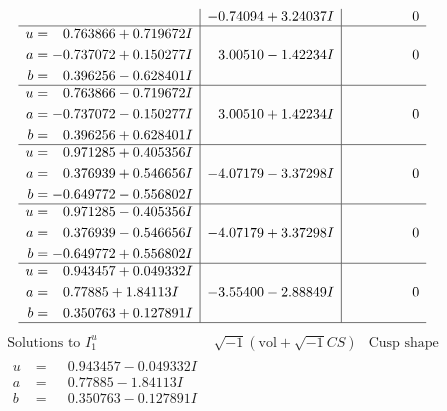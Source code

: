 \documentclass[1p]{elsarticle_modified}
\theoremstyle{definition}
\newcommand{\I}{\sqrt{-1}}
\begin{document}
$$\begin{array}{c|c|c}
 & -0.74094 + 3.24037 I & \phantom{-0.000000 } 0 \\ \hline\begin{aligned}
u &= \phantom{-}0.763866 + 0.719672 I \\
a &= -0.737072 + 0.150277 I \\
b &= \phantom{-}0.396256 - 0.628401 I\end{aligned}
 & \phantom{-}3.00510 - 1.42234 I & \phantom{-0.000000 } 0 \\ \hline\begin{aligned}
u &= \phantom{-}0.763866 - 0.719672 I \\
a &= -0.737072 - 0.150277 I \\
b &= \phantom{-}0.396256 + 0.628401 I\end{aligned}
 & \phantom{-}3.00510 + 1.42234 I & \phantom{-0.000000 } 0 \\ \hline\begin{aligned}
u &= \phantom{-}0.971285 + 0.405356 I \\
a &= \phantom{-}0.376939 + 0.546656 I \\
b &= -0.649772 - 0.556802 I\end{aligned}
 & -4.07179 - 3.37298 I & \phantom{-0.000000 } 0 \\ \hline\begin{aligned}
u &= \phantom{-}0.971285 - 0.405356 I \\
a &= \phantom{-}0.376939 - 0.546656 I \\
b &= -0.649772 + 0.556802 I\end{aligned}
 & -4.07179 + 3.37298 I & \phantom{-0.000000 } 0 \\ \hline\begin{aligned}
u &= \phantom{-}0.943457 + 0.049332 I \\
a &= \phantom{-}0.77885 + 1.84113 I \\
b &= \phantom{-}0.350763 + 0.127891 I\end{aligned}
 & -3.55400 - 2.88849 I & \phantom{-0.000000 } 0\\
 \hline 
 \end{array}$$\newpage$$\begin{array}{c|c|c}  
\text{Solutions to }I^u_{1}& \I (\text{vol} + \sqrt{-1}CS) & \text{Cusp shape}\\
 \hline 
\begin{aligned}
u &= \phantom{-}0.943457 - 0.049332 I \\
a &= \phantom{-}0.77885 - 1.84113 I \\
b &= \phantom{-}0.350763 - 0.127891 I\end{aligned}

\end{array}$$
\end{document}
